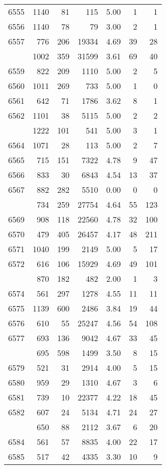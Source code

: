 \documentclass[
]{article}
\begin{document}
\begin{table}
\begin{tabular}[t]{lrrrrrr}
6555 & 1140 & 81 & 115 & 5.00 & 1 & 1\\
6556 & 1140 & 78 & 79 & 3.00 & 2 & 1\\
6557 & 776 & 206 & 19334 & 4.69 & 39 & 28\\
\addlinespace
6558 & 1002 & 359 & 31599 & 3.61 & 69 & 40\\
6559 & 822 & 209 & 1110 & 5.00 & 2 & 5\\
6560 & 1011 & 269 & 733 & 5.00 & 1 & 0\\
6561 & 642 & 71 & 1786 & 3.62 & 8 & 1\\
6562 & 1101 & 38 & 5115 & 5.00 & 2 & 2\\
\addlinespace
6563 & 1222 & 101 & 541 & 5.00 & 3 & 1\\
6564 & 1071 & 28 & 113 & 5.00 & 2 & 7\\
6565 & 715 & 151 & 7322 & 4.78 & 9 & 47\\
6566 & 833 & 30 & 6843 & 4.54 & 13 & 37\\
6567 & 882 & 282 & 5510 & 0.00 & 0 & 0\\
\addlinespace
6568 & 734 & 259 & 27754 & 4.64 & 55 & 123\\
6569 & 908 & 118 & 22560 & 4.78 & 32 & 100\\
6570 & 479 & 405 & 26457 & 4.17 & 48 & 211\\
6571 & 1040 & 199 & 2149 & 5.00 & 5 & 17\\
6572 & 616 & 106 & 15929 & 4.69 & 49 & 101\\
\addlinespace
6573 & 870 & 182 & 482 & 2.00 & 1 & 3\\
6574 & 561 & 297 & 1278 & 4.55 & 11 & 11\\
6575 & 1139 & 600 & 2486 & 3.84 & 19 & 44\\
6576 & 610 & 55 & 25247 & 4.56 & 54 & 108\\
6577 & 693 & 136 & 9042 & 4.67 & 33 & 45\\
\addlinespace
6578 & 695 & 598 & 1499 & 3.50 & 8 & 15\\
6579 & 521 & 31 & 2914 & 4.00 & 5 & 15\\
6580 & 959 & 29 & 1310 & 4.67 & 3 & 6\\
6581 & 739 & 10 & 22377 & 4.22 & 18 & 45\\
6582 & 607 & 24 & 5134 & 4.71 & 24 & 27\\
\addlinespace
6583 & 650 & 88 & 2112 & 3.67 & 6 & 20\\
6584 & 561 & 57 & 8835 & 4.00 & 22 & 17\\
6585 & 517 & 42 & 4335 & 3.30 & 10 & 9\\

\end{tabular}
\end{table}
\end{document}
